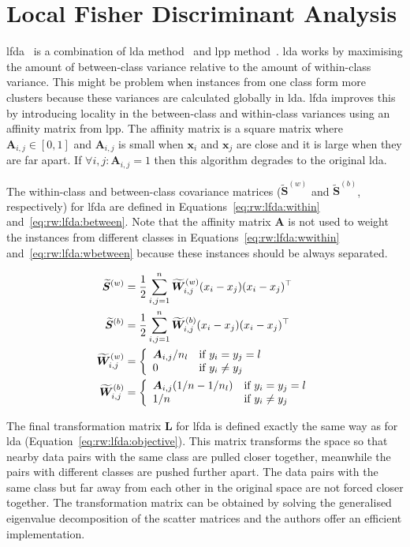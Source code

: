\section{Local Fisher Discriminant Analysis} \label{chap:rw:lfda}
\acf{lfda}~\citep{sugiyama2007dimensionality} is a combination of \acf{lda} method~\citep{fisher1936use} and \acf{lpp} method~\citep{he2003locality}. \ac{lda} works by maximising the amount of between-class variance relative to the amount of within-class variance. This might be problem when instances from one class form more clusters because these variances are calculated globally in \ac{lda}. \ac{lfda} improves this by introducing locality in the between-class and within-class variances using an affinity matrix from \ac{lpp}. The affinity matrix is a square matrix where $\bm{A}_{i,j} \in [0,1]$ and $\bm{A}_{i,j}$ is small when $\bm{x}_i$ and $\bm{x}_j$ are close and it is large when they are far apart. If $\forall i,j: \bm{A}_{i,j}=1$ then this algorithm degrades to the original \ac{lda}.

The within-class and between-class covariance matrices ($\widetilde{\bm{S}}^{(w)}$ and $\widetilde{\bm{S}}^{(b)}$, respectively) for \ac{lfda} are defined in Equations~\ref{eq:rw:lfda:within} and~\ref{eq:rw:lfda:between}. Note that the affinity matrix $\bm{A}$ is not used to weight the instances from different classes in Equations~\ref{eq:rw:lfda:wwithin} and~\ref{eq:rw:lfda:wbetween} because these instances should be always separated.

\begin{align}
\widetilde{\bm{S}}^{(w)} &= \frac{1}{2} \sum_{i,j=1}^n \widetilde{\bm{W}}_{i,j}^{(w)} (x_i-x_j)(x_i-x_j)^\top \label{eq:rw:lfda:within}
\\
\widetilde{\bm{S}}^{(b)} &= \frac{1}{2} \sum_{i,j=1}^n \widetilde{\bm{W}}_{i,j}^{(b)} (x_i-x_j)(x_i-x_j)^\top \label{eq:rw:lfda:between}
\\
\widetilde{\bm{W}}_{i,j}^{(w)} &= \left\{ \begin{array}{ll} \bm{A}_{i,j}/n_l & \mbox{if } y_i=y_j=l \\ 0 & \mbox{if } y_i \neq y_j \end{array} \right. \label{eq:rw:lfda:wwithin}
\\
\widetilde{\bm{W}}_{i,j}^{(b)} &= \left\{ \begin{array}{ll} \bm{A}_{i,j}(1/n-1/n_l) & \mbox{if } y_i=y_j=l \\ 1/n & \mbox{if } y_i \neq y_j \end{array} \right. \label{eq:rw:lfda:wbetween}
\end{align}

The final transformation matrix $\bm{L}$ for \ac{lfda} is defined exactly the same way as for \ac{lda} (Equation~\ref{eq:rw:lfda:objective}). This matrix transforms the space so that nearby data pairs with the same class are pulled closer together, meanwhile the pairs with different classes are pushed further apart. The data pairs with the same class but far away from each other in the original space are not forced closer together. The transformation matrix can be obtained by solving the generalised eigenvalue decomposition of the scatter matrices and the authors offer an efficient implementation.

